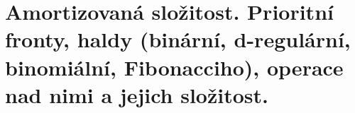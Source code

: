 \section[PAL - složitost, fronty, haldy]{Amortizovaná složitost. Prioritní fronty, haldy (binární, d-regulární, binomiální, Fibonacciho), operace nad nimi a jejich složitost.}